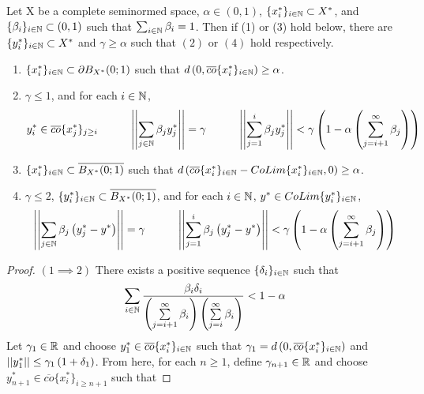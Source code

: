 \begin{lem}
    \label{lem:james}
    Let X be a complete seminormed space, $\alpha \in (0,1)$, $\{x_i^*\}_{i \in \N} \subset X^*$, and $\{\beta_i\}_{i \in \N} \subset (0,1)$ such that $\sum_{i \in \N} \beta_i=1$. Then if (1) or (3) hold below, there are $\{y_i^*\}_{i \in \N} \subset X^*$ and $\gamma \geq \alpha$ such that $(2)$ or $(4)$ hold respectively. 
    \begin{enumerate}
        \item $\{x_i^*\}_{i \in \N} \subset \partial B_{X^{*}}(0;1)$ such that $d\pa{ 0, \overline{co}\{x_i^*\}_{i \in \N}} \geq \alpha$.
        \item $\gamma \leq 1$, and for each $i \in \N$, 
        \begin{equation}
            y_i^* \in \overline{co}\{x_j^*\}_{j \geq i} \tab[1cm] \norm{\sum_{j \in \N} \beta_j y_j^*}=\gamma \tab[1cm] \norm{\sum_{j=1}^i \beta_j y_j^*} < \gamma \pa{1-\alpha \pa{\sum_{j=i+1}^{\infty} \beta_j}}
        \end{equation}
        \item $\{x_i^*\}_{i \in \N} \subset \overline{B_{X^*}(0;1)}$ such that $d\pa{ \overline{co}\{x_i^*\}_{i \in \N}-CoLim\{x_i^*\}_{i \in \N},0} \geq \alpha$.  
        \item $\gamma \leq 2$, $\{y_i^*\}_{i \in \N} \subset \overline{B_{X^*}(0;1)}$, and for each $i \in \N$, $y^* \in CoLim\{y_i^*\}_{i \in \N}$, 
        \begin{equation}
            \norm{\sum_{j \in \N} \beta_j \pa{ y_j^*-y^*}}=\gamma \tab[1cm] \norm{\sum_{j=1}^i \beta_j\pa{y_j^*-y^*}} < \gamma \pa{1-\alpha \pa{ \sum_{j=i+1}^{\infty} \beta_j}}
        \end{equation}
    \end{enumerate} 
    \begin{proof} $(1 \implies 2)$
        There exists a positive sequence $\{\delta_i\}_{i \in \N}$ such that 
        \begin{equation} 
            \sum_{i \in \N} \frac{\beta_i \delta_i}{\pa{ \sum\limits_{j=i+1}^{\infty} \beta_i} \pa{ \sum\limits_{j=i}^{\infty} \beta_i}} < 1-\alpha
        \end{equation} 
        Let $\gamma_1 \in \R$ and choose $y_1^* \in \overline{co}\{x_i^*\}_{i \in \N}$ such that 
        $\gamma_1 = d\pa{0,\overline{co}\{x_i^*\}_{i \in \N}}$
        and
        $\norm{y_1^*} \leq \gamma_1\pa{1+\delta_1}$.
        From here, for each $n \geq 1$, define $\gamma_{n+1}\in \R$ and choose $y_{n+1}^* \in \overline{co}\{x_i^*\}_{i \geq n+1}$ such that  

\end{proof}
\end{lem}
